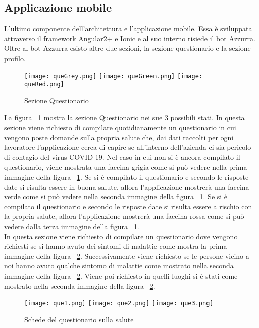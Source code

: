 \begin{trivlist}
	\item\subsection{Applicazione mobile}
	L'ultimo componente dell'architettura e l'applicazione mobile. Essa è sviluppata attraverso il framework Angular2+ e Ionic e al suo interno risiede il bot Azzurra. Oltre al bot Azzurra esisto altre due sezioni, la sezione questionario e la sezione profilo. 
	
	\begin{figure}[h]
		\centering
		\texttt{[image: queGrey.png]}\hfill
		\texttt{[image: queGreen.png]}\hfill
		\texttt{[image: queRed.png]}
		\caption{Sezione Questionario}\label{fig:que}
	\end{figure}
	
	La figura ~\ref{fig:que} mostra la sezione Questionario nei sue 3 possibili stati. In questa sezione viene richiesto di compilare quotidianamente un questionario in cui vengono poste domande sulla propria salute che, dai dati raccolti per ogni lavoratore l'applicazione cerca di capire se all'interno dell'azienda ci sia pericolo di contagio del virus COVID-19. Nel caso in cui non si è ancora compilato il questionario, viene mostrata una faccina grigia come si può vedere nella prima immagine della figura ~\ref{fig:que}. Se si è compilato il questionario e secondo le risposte date si risulta essere in buona salute, allora l'applicazione mostrerà una faccina verde come si può vedere nella seconda immagine della figura ~\ref{fig:que}. Se si è compilato il questionario e secondo le risposte date si risulta essere a rischio con la propria salute, allora l'applicazione mostrerà una faccina rossa come si può vedere dalla terza immagine della figura ~\ref{fig:que}.
	\\
	\clearpage
	In questa sezione viene richiesto di compilare un questionario dove vengono richiesti se si hanno avuto dei sintomi di malattie come mostra la prima immagine della figura ~\ref{fig:queSlide}. Successivamente viene richiesto se le persone vicino a noi hanno avuto qualche sintomo di malattie come mostrato nella seconda immagine della figura ~\ref{fig:queSlide}. Viene poi richiesto in quelli luoghi si è stati come mostrato nella seconda immagine della figura ~\ref{fig:queSlide}.
	\begin{figure}[h]
		\begin{center}
			\texttt{[image: que1.png]}
			\texttt{[image: que2.png]}
			\texttt{[image: que3.png]}
			\caption{Schede del questionario sulla salute}\label{fig:queSlide}
		\end{center}
	\end{figure}


\end{trivlist}
